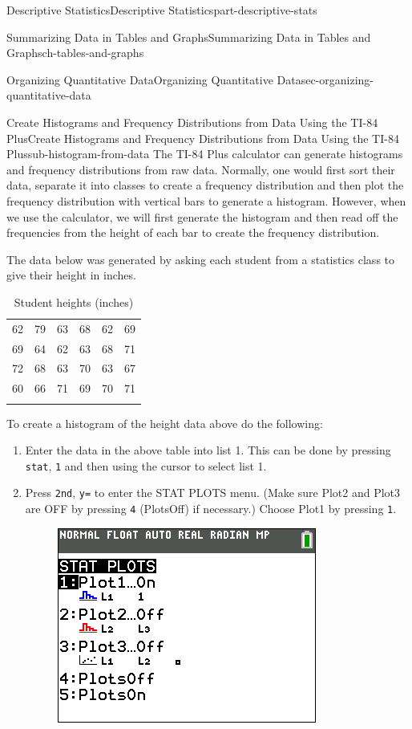 \documentclass[oneside,10pt,]{book}
\newcommand{\mono}[1]{\texttt{#1}}
\numberwithin{equation}{section}
\newcommand{\hrulethin}  {\noalign{\hrule height 0.04em}}
\newcommand{\hrulethick} {\noalign{\hrule height 0.11em}}
\begin{document}
\begin{partptx}{Descriptive Statistics}{}{Descriptive Statistics}{}{}{part-descriptive-stats}
\begin{chapterptx}{Summarizing Data in Tables and Graphs}{}{Summarizing Data in Tables and Graphs}{}{}{ch-tables-and-graphs}
\begin{sectionptx}{Organizing Quantitative Data}{}{Organizing Quantitative Data}{}{}{sec-organizing-quantitative-data}
\typeout{************************************************}
%
\begin{subsectionptx}{Create Histograms and Frequency Distributions from Data Using the TI-84 Plus}{}{Create Histograms and Frequency Distributions from Data Using the TI-84 Plus}{}{}{sub-histogram-from-data}
\hypertarget{p-50}{}%
The TI-84 Plus calculator can generate histograms and frequency distributions from raw data. Normally, one would first sort their data, separate it into classes to create a frequency distribution and then plot the frequency distribution with vertical bars to generate a histogram. However, when we use the calculator, we will first generate the histogram and then read off the frequencies from the height of each bar to create the frequency distribution.%
\par
\hypertarget{p-51}{}%
The data below was generated by asking each student from a statistics class to give their height in inches.%
\begin{table}
\centering
\begin{tabular}{llllll}\hrulethick
62&79&63&68&62&69\tabularnewline\hrulethin
69&64&62&63&68&71\tabularnewline\hrulethin
72&68&63&70&63&67\tabularnewline\hrulethin
60&66&71&69&70&71\tabularnewline\hrulethick
\end{tabular}
\caption{Student heights (inches)\label{tab-student-heights}}
\end{table}
\hypertarget{p-52}{}%
To create a histogram of the height data above do the following:%
\leavevmode%
\begin{enumerate}
\item\hypertarget{li-27}{}Enter the data in the above table into list 1. This can be done by pressing \mono{stat}, \mono{1} and then using the cursor to select list 1.%
\item\hypertarget{li-28}{}\hypertarget{p-53}{}%
Press \mono{2nd}, \mono{y=} to enter the STAT PLOTS menu. (Make sure Plot2 and Plot3 are OFF by pressing \mono{4} (PlotsOff) if necessary.) Choose Plot1 by pressing \mono{1}.%
\begin{figure}\centering\includegraphics[width=0.4\linewidth]{images/stat-plots-menu.png}

\end{figure}
\end{enumerate}
\end{subsectionptx}
\end{sectionptx}
\end{chapterptx}
\end{partptx}
\end{document}
